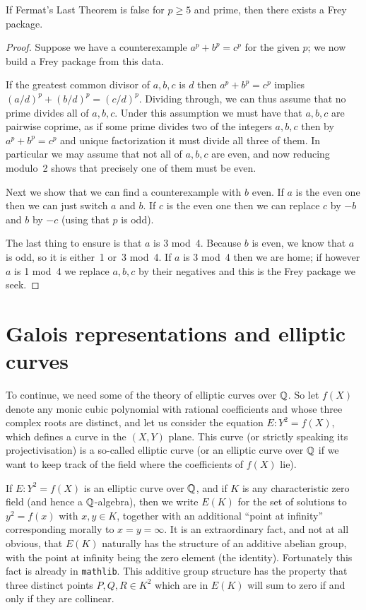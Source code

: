 \begin{lemma}
  \label{FreyPackage.of_not_FermatLastTheorem_p_ge_5}
  \leanok
  If Fermat's Last Theorem is false for $p \ge 5$ and prime, then there exists a Frey package.
\end{lemma}
\begin{proof}
  \leanok
  Suppose we have a counterexample $a^p+b^p=c^p$ for the given $p$; we now build a Frey package from this data.

  If the greatest common divisor of $a,b,c$ is $d$ then $a^p+b^p=c^p$ implies $(a/d)^p+(b/d)^p=(c/d)^p$.
  Dividing through, we can thus assume that no prime divides all of $a,b,c$. Under this assumption we
  must have that $a,b,c$ are pairwise coprime, as if some prime divides two of the integers $a,b,c$
  then by $a^p+b^p=c^p$ and unique factorization it must divide all three of them.
  In particular we may assume that not all of $a,b,c$ are even, and now reducing modulo~2 shows
  that precisely one of them must be even.

  Next we show that we can find a counterexample with $b$ even. If $a$ is the even one then we can
  just switch $a$ and $b$. If $c$ is the even one then we can replace $c$ by $-b$ and $b$ by $-c$
  (using that $p$ is odd).

  The last thing to ensure is that $a$ is 3 mod~4. Because $b$ is even, we know that $a$ is odd,
  so it is either~1 or~3 mod~4. If $a$ is 3 mod~4 then we are home; if however $a$ is 1 mod~4 we
  replace $a,b,c$ by their negatives and this is the Frey package we seek.
\end{proof}

\section{Galois representations and elliptic curves}\label{twopointfour}

To continue, we need some of the theory of elliptic curves over $\mathbb{Q}$. So let $f(X)$ denote any
monic cubic polynomial with rational coefficients and whose three complex roots are distinct,
and let us consider the equation $E:Y^2=f(X)$, which defines a curve in the $(X,Y)$ plane.
This curve (or strictly speaking its projectivisation) is a so-called elliptic curve
(or an elliptic curve over $\mathbb{Q}$ if we want to keep track of the field where the coefficients
of $f(X)$ lie).

If $E:Y^2=f(X)$ is an elliptic curve over $\mathbb{Q}$, and if $K$ is any characteristic zero field (and
hence a $\mathbb{Q}$-algebra), then we write $E(K)$ for the set of solutions to $y^2=f(x)$ with $x,y\in K$,
together with an additional ``point at infinity'' corresponding morally to $x=y=\infty$.
It is an extraordinary fact,
and not at all obvious, that $E(K)$ naturally has the structure of an additive abelian group,
with the point at infinity being the zero element (the identity). Fortunately this fact is
already in {\tt mathlib}. This additive group structure has
the property that three distinct points $P,Q,R\in K^2$ which are in $E(K)$ will sum to zero
if and only if they are collinear.

